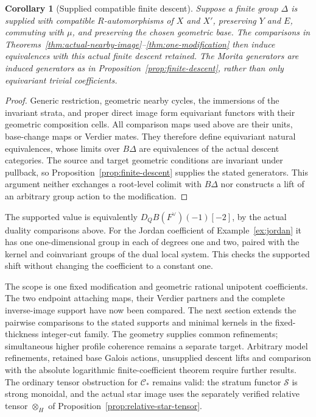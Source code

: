 \documentclass[11pt]{article}
\newtheorem{corollary}[theorem]{Corollary}
\theoremstyle{definition}
\theoremstyle{remark}
\begin{document}
\begin{corollary}[Supplied compatible finite descent]
\label{cor:nearby-finite-descent}
Suppose a finite group $\Delta$ is supplied with compatible
$R$-automorphisms of $X$ and $X'$, preserving $Y$ and $E$, commuting
with $\mu$, and preserving the chosen geometric base.  The comparisons
in Theorems~\ref{thm:actual-nearby-image}--\ref{thm:one-modification}
then induce equivalences with this actual finite descent retained.
The Morita generators are induced generators as in
Proposition~\ref{prop:finite-descent}, rather than only equivariant
trivial coefficients.
\end{corollary}
\begin{proof}
Generic restriction, geometric nearby cycles, the immersions of the
invariant strata, and proper direct image form equivariant functors
with their geometric composition cells.  All comparison maps used
above are their units, base-change maps or Verdier mates.  They
therefore define equivariant natural equivalences, whose limits over
$B\Delta$ are equivalences of the actual descent categories.  The
source and target geometric conditions are invariant under pullback,
so Proposition~\ref{prop:finite-descent} supplies the stated generators.
This argument neither exchanges a root-level colimit with $B\Delta$
nor constructs a lift of an arbitrary group action to the modification.
\end{proof}

The supported value is equivalently
$D_Q B(F^\vee)(-1)[-2]$, by the actual duality comparisons above.
For the Jordan coefficient of Example~\ref{ex:jordan} it has one
one-dimensional group in each of degrees one and two, paired with
the kernel and coinvariant groups of the dual local system.  This
checks the supported shift without changing the coefficient to a
constant one.

The scope is one fixed modification and geometric rational unipotent
coefficients.  The two endpoint attaching maps, their Verdier partners
and the complete inverse-image support have now been compared.
The next section extends the pairwise comparisons to the stated
supports and minimal kernels in the fixed-thickness integer-cut family.
The geometry supplies common refinements; simultaneous higher profile
coherence remains a separate target.  Arbitrary model refinements, retained base Galois
actions, unsupplied descent lifts and comparison with the absolute
logarithmic finite-coefficient theorem require further results.  The ordinary tensor obstruction for
$\mathcal C_*$ remains valid: the stratum functor $\mathcal S$ is strong monoidal, and the actual
star image uses the separately verified relative tensor $\otimes_H$
of Proposition~\ref{prop:relative-star-tensor}.
\end{document}
